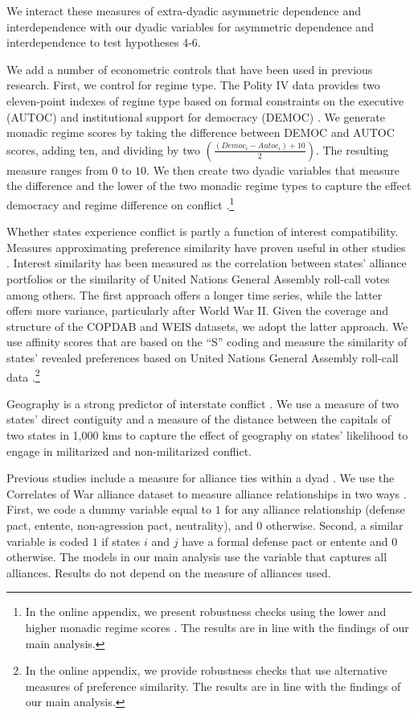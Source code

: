 \documentclass[12pt]{article}
\theoremstyle{hypothesis}
\begin{document}
\noindent We interact these measures of extra-dyadic asymmetric dependence and interdependence with our dyadic variables for asymmetric dependence and interdependence to test hypotheses 4-6.

We add a number of econometric controls that have been used in previous research. First, we control for regime type. The Polity IV data provides two eleven-point indexes of regime type based on formal constraints on the executive (AUTOC) and institutional support for democracy (DEMOC) \citep{Jaggers:1995}. We generate monadic regime scores by taking the difference between DEMOC and AUTOC scores, adding ten, and dividing by two $\left(\frac{\left(Democ_{i}-Autoc_{i}\right)+10}{2}\right)$. The resulting measure ranges from $0$ to $10$. We then create two dyadic variables that measure the difference and the lower of the two monadic regime types to capture the effect democracy and regime difference on conflict \citep{Gartzke:2013}.\footnote{In the online appendix, we present robustness checks using the lower and higher monadic regime scores \citep{Choi:2015}. The results are in line with the findings of our main analysis.}

Whether states experience conflict is partly a function of interest compatibility. Measures approximating preference similarity have proven useful in other studies \citep{Mesquita:1981,Gartzke:1998}. Interest similarity has been measured as the correlation between states' alliance portfolios or the similarity of United Nations General Assembly roll-call votes among others. The first approach offers a longer time series, while the latter offers more variance, particularly after World War II. Given the coverage and structure of the COPDAB and WEIS datasets, we adopt the latter approach. We use affinity scores that are based on the ``S'' coding \citep{Signorino:2001} and measure the similarity of states' revealed preferences based on United Nations General Assembly roll-call data \citep{Gartzke:1998}.\footnote{In the online appendix, we provide robustness checks that use alternative measures of preference similarity. The results are in line with the findings of our main analysis.}

Geography is a strong predictor of interstate conflict \citep{Maoz:1993}. We use a measure of two states' direct contiguity and a measure of the distance between the capitals of two states in 1,000 kms to capture the effect of geography on states' likelihood to engage in militarized and non-militarized conflict.

Previous studies include a measure for alliance ties within a dyad \citep{Oneal:1997}. We use the Correlates of War alliance dataset to measure alliance relationships in two ways \citep{Gibler:2009}. First, we code a dummy variable equal to $1$ for any alliance relationship (defense pact, entente, non-agression pact, neutrality), and $0$ otherwise. Second, a similar variable is coded $1$ if states $i$ and $j$ have a formal defense pact or entente and $0$ otherwise. The models in our main analysis use the variable that captures all alliances. Results do not depend on the measure of alliances used.
\end{document}

